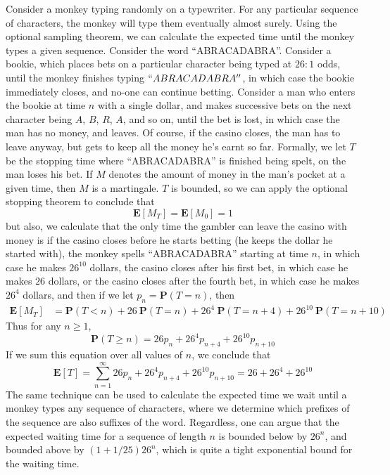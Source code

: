 \begin{example}
    Consider a monkey typing randomly on a typewriter. For any particular sequence of characters, the monkey will type them eventually almost surely. Using the optional sampling theorem, we can calculate the expected time until the monkey types a given sequence. Consider the word ``ABRACADABRA''. Consider a bookie, which places bets on a particular character being typed at $26:1$ odds, until the monkey finishes typing $``ABRACADABRA''$, in which case the bookie immediately closes, and no-one can continue betting. Consider a man who enters the bookie at time $n$ with a single dollar, and makes successive bets on the next character being $A$, $B$, $R$, $A$, and so on, until the bet is lost, in which case the man has no money, and leaves. Of course, if the casino closes, the man has to leave anyway, but gets to keep all the money he's earnt so far. Formally, we let $T$ be the stopping time where ``ABRACADABRA'' is finished being spelt, on the man loses his bet. If $M$ denotes the amount of money in the man's pocket at a given time, then $M$ is a martingale. $T$ is bounded, so we can apply the optional stopping theorem to conclude that
    \[ \mathbf{E}[M_T] = \mathbf{E}[M_0] = 1 \]
    but also, we calculate that the only time the gambler can leave the casino with money is if the casino closes before he starts betting (he keeps the dollar he started with), the monkey spells ``ABRACADABRA'' starting at time $n$, in which case he makes $26^10$ dollars, the casino closes after his first bet, in which case he makes $26$ dollars, or the casino closes after the fourth bet, in which case he makes $26^4$ dollars, and then if we let $p_n = \mathbf{P}(T = n)$, then
    \begin{align*}
        \mathbf{E}[M_T] &= \mathbf{P}(T < n) + 26\ \mathbf{P}(T = n) + 26^4\ \mathbf{P}(T = n + 4) + 26^{10}\ \mathbf{P}(T = n + 10)
    \end{align*}
    Thus for any $n \geq 1$,
    \[ \mathbf{P}(T \geq n) = 26p_n + 26^4 p_{n+4} + 26^{10} p_{n + 10} \]
    If we sum this equation over all values of $n$, we conclude that
    \[ \mathbf{E}[T] = \sum_{n = 1}^\infty 26p_n + 26^4 p_{n+4} + 26^{10} p_{n+10} = 26 + 26^4 + 26^{10} \]
    The same technique can be used to calculate the expected time we wait until a monkey types any sequence of characters, where we determine which prefixes of the sequence are also suffixes of the word. Regardless, one can argue that the expected waiting time for a sequence of length $n$ is bounded below by $26^n$, and bounded above by $(1 + 1/25)26^n$, which is quite a tight exponential bound for the waiting time.
\end{example}

